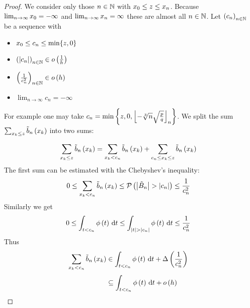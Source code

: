 \begin{proof}
  We consider only those $n\in\N$ with $\x[0] \le z \le \x[n]$. Because $\lim_{n\to\infty} \x[0] = -\infty$ and $\lim_{n\to\infty} \x[n] = \infty$ these are almost all $n\in\N$. Let $\seq{c_n}$ be a sequence with
  \begin{itemize}
    \item $\x[0] \le c_n \le \min\{z,0\}$
    \item $\seq{\abs{c_n}}\in\littleo{\frac 1h}$
    \item $\seq{\frac{1}{c_n^2}} \in \littleo{h}$
    \item $\lim_{n\to\infty} c_n=-\infty$
  \end{itemize}
  For example one may take $c_n = \min\left\{z, 0, \xdown{- \sqrt[3]{n}\sqrt{\frac pq}}\right\}$. We split the sum $\sum_{\x \le z} \bb{\x}$ into two sums:

  \begin{align}
    \sum_{\x \le z} \bb{\x} = \sum_{\x < c_n} \bb{\x} + \sum_{c_n \le \x \le z} \bb{\x}
  \end{align}
  The first sum can be estimated with the Chebyshev's inequality:
  \begin{align}
    0 \le \sum_{\x < c_n} \bb{\x} \le \P{\abs{\BBs} > \abs{c_n}} \le \frac{1}{c_n^2}
  \end{align}
  Similarly we get
  \begin{align}
    0 \le \int_{t < c_n} \fphi{t}\d{t} \le \int_{\abs{t} > \abs{c_n}} \fphi{t} \d{t} \le \frac{1}{c_n^2}
  \end{align}
  Thus
  \begin{align}
    \sum_{\x < c_n} \bb{\x} & \in \int_{t < c_n} \fphi{t}\d{t} + \bigabs{\frac{1}{c_n^2}} \nl
    & \subseteq \int_{t < c_n} \fphi{t}\d{t} + \littleo{h}
  \end{align}


\end{proof}
